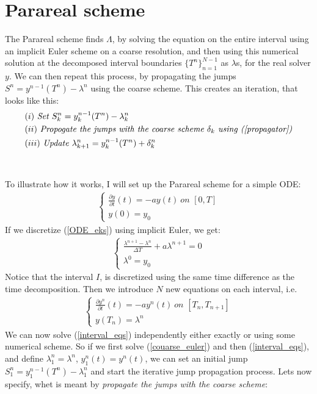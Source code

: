 \section{Parareal scheme}
The Parareal scheme finds $\Lambda$, by solving the equation on the entire interval using an implicit Euler scheme on a coarse resolution, and then using this numerical solution at the decomposed interval boundaries $\{T^n\}_{n=1}^{N-1}$ as $\lambda$s, for the real solver $y$. We can then repeat this process, by propagating the jumps $S^n=y^{n-1}(T^n)-\lambda^n$ using the coarse scheme. This creates an iteration, that looks like this:
\begin{align*}
&(i) \ \textit{Set $S^n_k = y_k^{n-1}(T^n)-\lambda_k^n$} \\
&(ii) \ \textit{Propogate the jumps with the coarse scheme $\delta_k$ using (\ref{propagator})} \\
&(iii) \ \textit{Update $\lambda_{k+1}^n=y_k^{n-1}(T^n) + \delta_k^n$}
\end{align*} 
\\
\\
To illustrate how it works, I will set up the Parareal scheme for a simple ODE:
\begin{align}
\left\{
     \begin{array}{lr}
		\frac{\partial y}{\partial t}(t)=-ay(t) \ 				\textit{on $[0,T]$} \\
		y(0)=y_0
	\end{array}
\right.	\label{ODE_eks}
\end{align}
If we discretize (\ref{ODE_eks}) using implicit Euler, we get:
\begin{align}
\left\{
     \begin{array}{lr}
		\frac{\lambda^{n+1}-\lambda^{n}}{\Delta T}+a\lambda^{n+1}=0  \\
		\lambda^0=y_0
	\end{array}
\right.	\label{couarse_euler}
\end{align}
Notice that the interval $I$, is discretized using the same time difference as the time decomposition. Then we introduce $N$ new equations on each interval, i.e.
\begin{align}
\left\{
     \begin{array}{lr}
		\frac{\partial y^n}{\partial t}(t)=-ay^n(t) \ 				\textit{on $[T_n,T_{n+1}]$} \\
		y(T_n)=\lambda^n
	\end{array}
\right. \label{interval_eqs}
\end{align}
We can now solve (\ref{interval_eqs}) independently either exactly or using some numerical scheme. So if we first solve (\ref{couarse_euler}) and then (\ref{interval_eqs}), and define $\lambda_1^n=\lambda^n$, $y_1^n(t)=y^n(t)$, we can set an initial jump $S_1^n=y_1^{n-1}(T^n)-\lambda_1^n$ and start the iterative jump propagation process. Lets now specify, whet is meant by \textit{propagate the jumps with the coarse scheme}:
